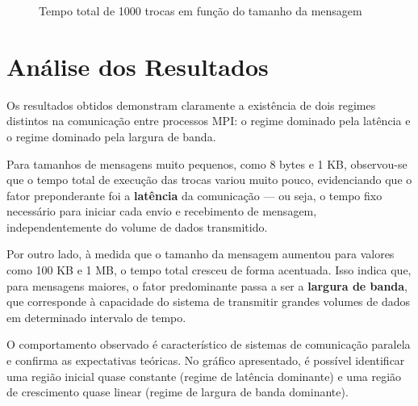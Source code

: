 \documentclass[a4paper, 12pt]{article}
\begin{document}
	\begin{figure}[H]
		\centering
		\caption{Tempo total de 1000 trocas em função do tamanho da mensagem}
		\label{fig:tempo_vs_tamanho}
	\end{figure}
	
	\section{Análise dos Resultados}
	
	\hspace{0.62cm}Os resultados obtidos demonstram claramente a existência de dois regimes distintos na comunicação entre processos MPI: o regime dominado pela latência e o regime dominado pela largura de banda.
	
	\hspace{0.62cm}Para tamanhos de mensagens muito pequenos, como 8 bytes e 1 KB, observou-se que o tempo total de execução das trocas variou muito pouco, evidenciando que o fator preponderante foi a \textbf{latência} da comunicação — ou seja, o tempo fixo necessário para iniciar cada envio e recebimento de mensagem, independentemente do volume de dados transmitido.
	
	\hspace{0.62cm}Por outro lado, à medida que o tamanho da mensagem aumentou para valores como 100 KB e 1 MB, o tempo total cresceu de forma acentuada. Isso indica que, para mensagens maiores, o fator predominante passa a ser a \textbf{largura de banda}, que corresponde à capacidade do sistema de transmitir grandes volumes de dados em determinado intervalo de tempo.
	
	\hspace{0.62cm}O comportamento observado é característico de sistemas de comunicação paralela e confirma as expectativas teóricas. No gráfico apresentado, é possível identificar uma região inicial quase constante (regime de latência dominante) e uma região de crescimento quase linear (regime de largura de banda dominante).
	
\end{document}
